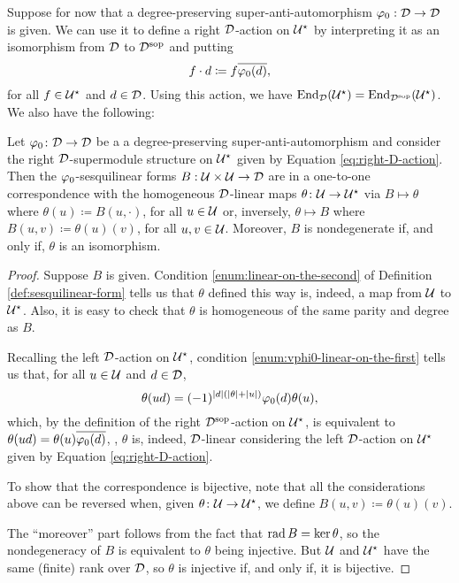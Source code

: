 Suppose for now that a degree-preserving su\-per\--an\-ti\--auto\-mor\-phism $\varphi_0: \mathcal{D} \to \mathcal{D}$ is given.
We can use it to define a right $\mathcal{D}$-action on $\mathcal U^\star$ by interpreting it as an isomorphism from $\mathcal{D}$ to $\mathcal{D}^{\mathrm{sop}}$ and putting
%
\begin{equation}\label{eq:right-D-action}
	f\cdot d \coloneqq f \overline{\varphi_0(d)},
\end{equation}
%
for all $f \in \mathcal U^\star$ and $d\in \mathcal{D}$.
Using this action, we have $\operatorname{End}_{\mathcal{D}} (\mathcal U^\star) = \operatorname{End}_{\mathcal{D}^{\mathrm{sop}}} (\mathcal U^\star)$. We also have the following:

\begin{prop}\label{prop:sesquilinear-form-iff-D-linear-map}
	Let $\varphi_0\colon \mathcal{D} \to \mathcal{D}$ be a a degree-preserving su\-per\--an\-ti\--auto\-mor\-phism and consider the right $\mathcal{D}$-supermodule structure on $\mathcal U^\star$ given by Equation \eqref{eq:right-D-action}.
	Then the $\varphi_0$-sesquilinear forms $B:\mathcal U\times\mathcal U \to \mathcal{D}$ are in a one-to-one correspondence with the homogeneous $\mathcal{D}$-linear maps $\theta\colon \mathcal U \to \mathcal U^\star$ via $B \mapsto \theta$ where $\theta(u) \coloneqq B(u, \cdot)$, for all $u \in \mathcal U$ or, inversely, $\theta \mapsto B$ where $B(u,v) \coloneqq \theta(u)(v)$, for all $u, v\in \mathcal U$.
	Moreover, $B$ is nondegenerate if, and only if, $\theta$ is an isomorphism.
\end{prop}

\begin{proof}
	Suppose $B$ is given. Condition \eqref{enum:linear-on-the-second} of Definition \ref{def:sesquilinear-form} tells us that $\theta$ defined this way is, indeed, a map from $\mathcal U$ to $\mathcal U^\star$.
	Also, it is easy to check that $\theta$ is homogeneous of the same parity and degree as $B$.

	Recalling the left $\mathcal{D}$-action on $\mathcal U^\star$, condition \eqref{enum:vphi0-linear-on-the-first} tells us that, for all $u\in \mathcal U$ and $d\in \mathcal{D}$,
	\[
		\theta (ud) = (-1)^{|d|(|\theta|+|u|)}\varphi_0 (d) \theta (u),
	\]
	which, by the definition of the right $\mathcal{D}^{\mathrm{sop}}$-action on $\mathcal U^\star$, is equivalent to $\theta(ud) = \theta(u) \overline{\varphi_0(d)}$, \ie, $\theta$ is, indeed, $\mathcal{D}$-linear considering the left $\mathcal{D}$-action on $\mathcal U^\star$ given by Equation \eqref{eq:right-D-action}.

	To show that the correspondence is bijective, note that all the considerations above can be reversed when, given $\theta\colon \mathcal U \to \mathcal U^\star$, we define  $B(u, v) \coloneqq \theta(u)(v)$.

	The ``moreover'' part follows from the fact that $\operatorname{rad} B = \ker \theta$, so the nondegeneracy of $B$ is equivalent to $\theta$ being injective. But $\mathcal U$ and $\mathcal U^\star$ have the same (finite) rank over $\mathcal{D}$, so $\theta$ is injective if, and only if, it is bijective.
\end{proof}

